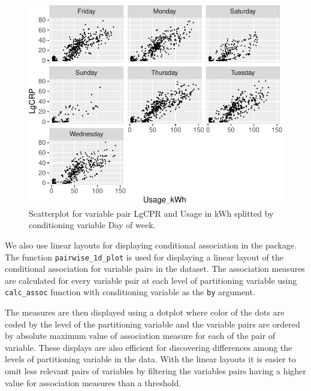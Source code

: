 \begin{Schunk}
\begin{figure}

{\centering \includegraphics{rj_paper_files/figure-latex/high-diff-1} 

}

\caption[Scatterplot for variable pair LgCPR and Usage in kWh splitted by conditioning variable Day of week]{Scatterplot for variable pair LgCPR and Usage in kWh splitted by conditioning variable Day of week.}\label{fig:high-diff}
\end{figure}
\end{Schunk}

We also use linear layouts for displaying conditional association in the
package. The function \texttt{pairwise\_1d\_plot} is used for displaying
a linear layout of the conditional association for variable pairs in the
dataset. The association measures are calculated for every variable pair
at each level of partitioning variable using \texttt{calc\_assoc}
function with conditioning variable as the \texttt{by} argument.

The measures are then displayed using a dotplot where color of the dots
are coded by the level of the partitioning variable and the variable
pairs are ordered by absolute maximum value of association measure for
each of the pair of variable. These displays are also efficient for
discovering differences among the levels of partitioning variable in the
data. With the linear layouts it is easier to omit less relevant pairs
of variables by filtering the variables pairs having a higher value for
association measures than a threshold.

